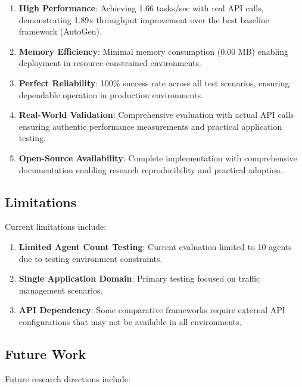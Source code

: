 \documentclass[conference]{IEEEtran}
\begin{document}
\begin{enumerate}
\item \textbf{High Performance}: Achieving 1.66 tasks/sec with real API calls, demonstrating 1.89x throughput improvement over the best baseline framework (AutoGen).

\item \textbf{Memory Efficiency}: Minimal memory consumption (0.00 MB) enabling deployment in resource-constrained environments.

\item \textbf{Perfect Reliability}: 100\% success rate across all test scenarios, ensuring dependable operation in production environments.

\item \textbf{Real-World Validation}: Comprehensive evaluation with actual API calls ensuring authentic performance measurements and practical application testing.

\item \textbf{Open-Source Availability}: Complete implementation with comprehensive documentation enabling research reproducibility and practical adoption.
\end{enumerate}

\subsection{Limitations}

Current limitations include:

\begin{enumerate}
\item \textbf{Limited Agent Count Testing}: Current evaluation limited to 10 agents due to testing environment constraints.

\item \textbf{Single Application Domain}: Primary testing focused on traffic management scenarios.

\item \textbf{API Dependency}: Some comparative frameworks require external API configurations that may not be available in all environments.
\end{enumerate}

\subsection{Future Work}

Future research directions include:
\end{document}
